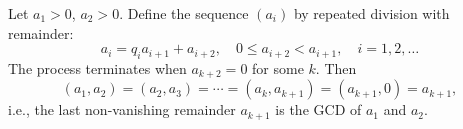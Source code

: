 Let $a_1 > 0$, $a_2 > 0$. Define the sequence $(a_i)$ by repeated division with remainder:
$$a_i = q_i a_{i+1} + a_{i+2}, \quad 0 \leq a_{i+2} < a_{i+1}, \quad i = 1, 2, \ldots$$
The process terminates when $a_{k+2} = 0$ for some $k$. Then
$$(a_1, a_2) = (a_2, a_3) = \cdots = (a_k, a_{k+1}) = (a_{k+1}, 0) = a_{k+1},$$
i.e., the last non-vanishing remainder $a_{k+1}$ is the GCD of $a_1$ and $a_2$.
